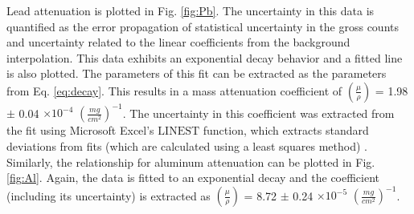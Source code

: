 Lead attenuation is plotted in Fig. \ref{fig:Pb}. The uncertainty in this data is quantified as the error propagation of statistical uncertainty in the gross counts and uncertainty related to the linear coefficients from the background interpolation. This data exhibits an exponential decay behavior and a fitted line is also plotted. The parameters of this fit can be extracted as the parameters from Eq. \ref{eq:decay}. This results in a mass attenuation coefficient of $(\frac{\mu}{\rho})$ = 1.98 $\pm$ 0.04 $\times 10^{-4}$ $(\frac{mg}{cm^2})^{-1}$. The uncertainty in this coefficient was extracted from the fit using Microsoft Excel’s $\mathrm{LINEST}$ function, which extracts standard deviations from fits (which are calculated using a least squares method) \cite{excel}. Similarly, the relationship for aluminum attenuation can be plotted in Fig. \ref{fig:Al}. Again, the data is fitted to an exponential decay and the coefficient (including its uncertainty) is extracted as $(\frac{\mu}{\rho})$ = 8.72 $\pm$ 0.24 $\times 10^{-5}$ $(\frac{mg}{cm^2})^{-1}$.

